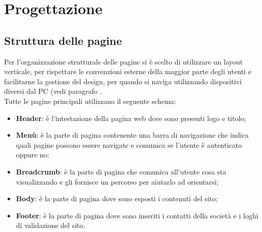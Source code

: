 \section{Progettazione}
    \subsection{Struttura delle pagine}
    Per l'organizzazione strutturale delle pagine si è scelto di utilizzare un layout verticale, per rispettare le convenzioni esterne della maggior parte degli utenti e facilitarne la gestione del design, per quando si naviga utilizzando dispositivi diversi dal PC (vedi paragrafo .\\
    Tutte le pagine principali utilizzano il seguente schema:
    \begin{itemize}
        \item \textbf{Header}: è l'intestazione della pagina web dove sono presenti logo e titolo;
        \item \textbf{Menù}: è la parte di pagina contenente una barra di navigazione che indica quali pagine possono essere navigate e comunica se l'utente è autenticato oppure no;
        \item \textbf{Breadcrumb}: è la parte di pagina che comunica all'utente cosa sta visualizzando e gli fornisce un percorso per aiutarlo ad orientarsi;
        \item \textbf{Body}: è la parte di pagina dove sono esposti i contenuti del sito;
        \item \textbf{Footer}: è la parte di pagina dove sono inseriti i contatti della società e i loghi di validazione del sito.
    \end{itemize}
    
